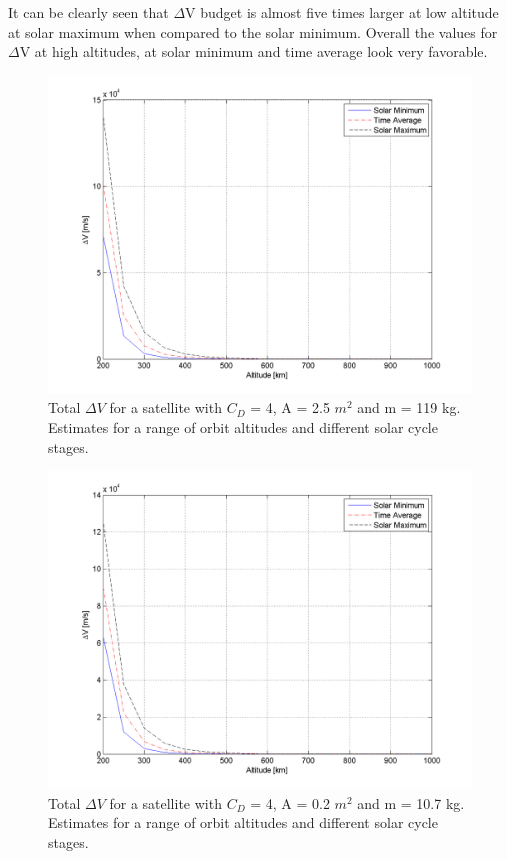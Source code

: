 It can be clearly seen that $\Delta$V budget is almost five times larger at low altitude at solar maximum when compared to the solar minimum. Overall the values for $\Delta$V at high altitudes, at solar minimum and time average look very favorable. 

\begin{figure}[h!]
\centering
\includegraphics[width=0.95\textheight, angle=90]{chapters/img/deltaVEmitter.png}
\caption{Total $\Delta V$ for a satellite with $C_D$ = 4, A = 2.5 $m^2$ and m = 119 kg. Estimates for a range of orbit altitudes and different solar cycle stages.}
\label{fig:deltaVGraph1}
\end{figure}

\begin{figure}[h!]
\centering
\includegraphics[width=0.95\textheight, angle=90]{chapters/img/deltaVReceiver.png}
\caption{Total $\Delta V$ for a satellite with $C_D$ = 4, A = 0.2 $m^2$ and m = 10.7 kg. Estimates for a range of orbit altitudes and different solar cycle stages.}
\label{fig:deltaVGraph2}
\end{figure}   

